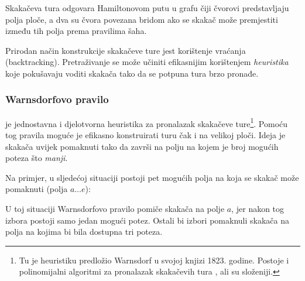 Skakačeva tura odgovara Hamiltonovom putu u grafu
čiji čvorovi predstavljaju polja ploče,
a dva su čvora povezana bridom ako se skakač
može premjestiti između tih polja prema pravilima šaha.

Prirodan način konstrukcije skakačeve ture jest korištenje vraćanja (backtracking).
Pretraživanje se može učiniti efikasnijim korištenjem
\emph{heuristika} koje pokušavaju voditi skakača tako da
se potpuna tura brzo pronađe.

\subsubsection{Warnsdorfovo pravilo}


 je jednostavna i djelotvorna heuristika
za pronalazak skakačeve ture\footnote{Tu je heuristiku predložio
Warnsdorf u svojoj knjizi \cite{war23} 1823. godine. Postoje
i polinomijalni algoritmi za pronalazak skakačevih tura
\cite{par97}, ali su složeniji.}.
Pomoću tog pravila moguće je efikasno konstruirati turu
čak i na velikoj ploči.
Ideja je skakača uvijek pomaknuti tako da završi
na polju na kojem je broj mogućih poteza što
\emph{manji}.

Na primjer, u sljedećoj situaciji postoji pet
mogućih polja na koja se skakač može pomaknuti (polja $a \ldots e$):
\begin{center}
\end{center}
U toj situaciji Warnsdorfovo pravilo pomiče skakača na polje $a$,
jer nakon tog izbora postoji samo jedan mogući potez.
Ostali bi izbori pomaknuli skakača na polja na kojima
bi bila dostupna tri poteza.



